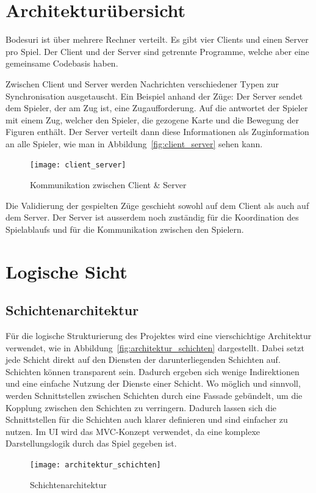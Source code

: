 \documentclass[12pt,halfparskip]{scrartcl}
\begin{document}


\section{Architekturübersicht}

Bodesuri ist über mehrere Rechner verteilt. Es gibt vier Clients und einen Server pro Spiel. Der Client und der Server sind getrennte Programme, welche aber eine gemeinsame Codebasis haben.

Zwischen Client und Server werden Nachrichten verschiedener Typen zur Synchronisation ausgetauscht. Ein Beispiel anhand der Züge: Der Server sendet dem Spieler, der am Zug ist, eine Zugaufforderung. Auf die antwortet der Spieler mit einem Zug, welcher den Spieler, die gezogene Karte und die Bewegung der Figuren enthält. Der Server verteilt dann diese Informationen als Zuginformation an alle Spieler, wie man in Abbildung~\vref{fig:client_server} sehen kann.

\begin{figure}[h]
	\centering
	\texttt{[image: client\_server]}
	\caption{Kommunikation zwischen Client \& Server}
	\label{fig:client_server}
\end{figure}

Die Validierung der gespielten Züge geschieht sowohl auf dem Client als auch auf dem Server. Der Server ist ausserdem noch zuständig für die Koordination des Spielablaufs und für die Kommunikation zwischen den Spielern.

\clearpage
\section{Logische Sicht}

\subsection{Schichtenarchitektur}

Für die logische Strukturierung des Projektes wird eine vierschichtige Architektur verwendet, wie in Abbildung~\vref{fig:architektur_schichten} dargestellt. Dabei setzt jede Schicht direkt auf den Diensten der darunterliegenden Schichten auf. Schichten können transparent sein. Dadurch ergeben sich wenige Indirektionen und eine einfache Nutzung der Dienste einer Schicht. Wo möglich und sinnvoll, werden Schnittstellen zwischen Schichten durch eine Fassade gebündelt, um die Kopplung zwischen den Schichten zu verringern. Dadurch lassen sich die Schnittstellen für die Schichten auch klarer definieren und sind einfacher zu nutzen. Im UI wird das MVC-Konzept verwendet, da eine komplexe Darstellungslogik durch das Spiel gegeben ist.
\begin{figure}
	\centering
	\texttt{[image: architektur\_schichten]}
	\caption{Schichtenarchitektur}
	\label{fig:architektur_schichten}
\end{figure}
\end{document}
